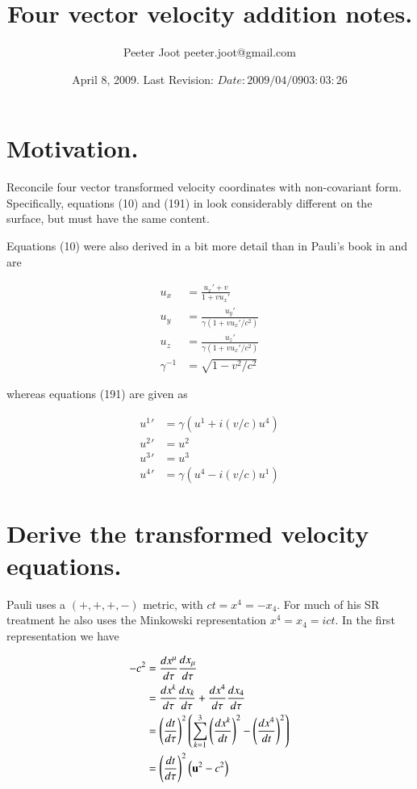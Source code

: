 \documentclass{article}
\title{ Four vector velocity addition notes. }
\author{Peeter Joot \quad peeter.joot@gmail.com }
\date{ April 8, 2009.  Last Revision: $Date: 2009/04/09 03:03:26 $ }
\begin{document}
\maketitle{}
\tableofcontents
\section{ Motivation. }

Reconcile four vector transformed velocity coordinates with non-covariant form.
Specifically, equations (10) and (191) in \cite{pauli1981tr} look considerably
different on the surface, but must have the same content.

Equations (10) were also derived in a bit more detail than in Pauli's book in
\cite{PJpauliVelocityAddition} and are

\begin{align}\label{eqn:eqn10}
u_x &= \frac{ {u_x}' + v  }{ 1 + v {u_x}'} \\
u_y &= \frac{{u_y}'}{\gamma (1 + v {u_x}'/c^2)} \\
u_z &= \frac{{u_z}'}{\gamma (1 + v {u_x}'/c^2)} \\
\gamma^{-1} &= \sqrt{ 1 - v^2/c^2}
\end{align}

whereas equations (191) are given as

\begin{align}\label{eqn:eqn191}
{u^1}' &= \gamma ( u^1 + i (v/c) u^4) \\
{u^2}' &= {u^2} \\
{u^3}' &= {u^3} \\
{u^4}' &= \gamma ( u^4 - i (v/c) u^1)
\end{align}

\section{ Derive the transformed velocity equations. }

Pauli uses a $(+,+,+,-)$ metric, with $ct = x^4 = - x_4$.  For much of his SR treatment he also uses the Minkowski representation $x^4 = x_4 = ict$. In the first representation we have

\begin{align*}
-c^2 
&= \frac{dx^\mu}{d\tau} \frac{dx_\mu}{d\tau} \\
&= \frac{dx^k}{d\tau} \frac{dx_k}{d\tau} + \frac{dx^4}{d\tau} \frac{dx_4}{d\tau} \\
&= \left(\frac{dt}{d\tau}\right)^2 \left( \sum_{k=1}^3 \left(\frac{dx^k}{dt}\right)^2 - \left(\frac{dx^4}{dt}\right)^2 \right) \\
&= \left(\frac{dt}{d\tau}\right)^2 \left( \mathbf{u}^2 - c^2 \right) \\
\end{align*}
\end{document}
